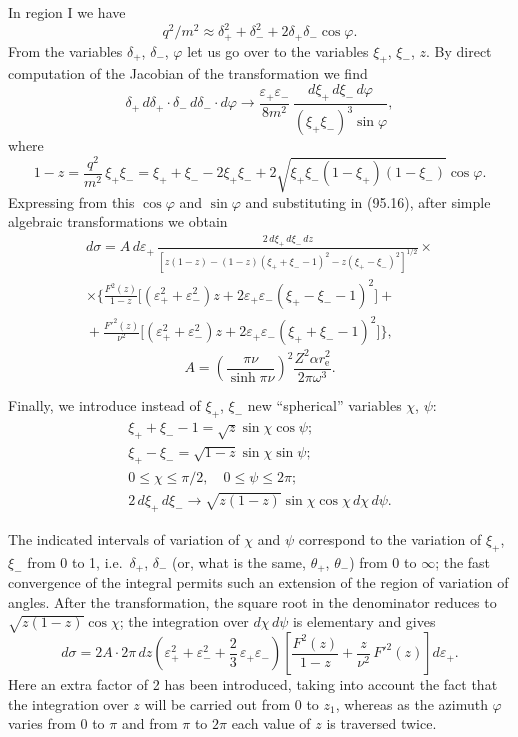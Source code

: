 In region I we have
\[
q^2/m^2 \approx \delta_+^2 + \delta_-^2 + 2\delta_+\delta_-\cos\varphi.
\]
From the variables $\delta_+$, $\delta_-$, $\varphi$ let us go over to the variables $\xi_+$, $\xi_-$, $z$. By direct computation of the Jacobian of the transformation we find
\[
\delta_+\,d\delta_+\cdot\delta_-\,d\delta_-\cdot d\varphi \to \frac{\varepsilon_+\varepsilon_-}{8m^2}\,\frac{d\xi_+\,d\xi_-\,d\varphi}{(\xi_+\xi_-)^3\sin\varphi},
\]
where
\[
1 - z = \frac{q^2}{m^2}\,\xi_+\xi_- = \xi_+ + \xi_- - 2\xi_+\xi_- + 2\sqrt{\xi_+\xi_-(1-\xi_+)(1-\xi_-)}\cos\varphi.
\]
Expressing from this $\cos\varphi$ and $\sin\varphi$ and substituting in (95.16), after simple algebraic transformations we obtain
\begin{multline*}
d\sigma = A\,d\varepsilon_+\,\frac{2\,d\xi_+\,d\xi_-\,dz}{[z(1-z) - (1-z)(\xi_+ + \xi_- - 1)^2 - z(\xi_+ - \xi_-)^2]^{1/2}} \times {} \\
\times \biggl\{\frac{F^2(z)}{1-z}\bigl[(\varepsilon_+^2 + \varepsilon_-^2)z + 2\varepsilon_+\varepsilon_-(\xi_+ - \xi_- - 1)^2\bigr] + {} \\
{} + \frac{F'^2(z)}{\nu^2}\bigl[(\varepsilon_+^2 + \varepsilon_-^2)z + 2\varepsilon_+\varepsilon_-(\xi_+ + \xi_- - 1)^2\bigr]\biggr\},
\end{multline*}
\[
A = \left(\frac{\pi\nu}{\sinh\pi\nu}\right)^{\!2}\frac{Z^2\alpha r_\mathrm{e}^2}{2\pi\omega^3}.
\]

Finally, we introduce instead of $\xi_+$, $\xi_-$ new ``spherical'' variables $\chi$, $\psi$:
\begin{gather*}
\xi_+ + \xi_- - 1 = \sqrt{z}\sin\chi\cos\psi; \\
\xi_+ - \xi_- = \sqrt{1-z}\sin\chi\sin\psi; \\
0 \leqslant \chi \leqslant \pi/2, \quad 0 \leqslant \psi \leqslant 2\pi; \\
2\,d\xi_+\,d\xi_- \to \sqrt{z(1-z)}\sin\chi\cos\chi\,d\chi\,d\psi.
\end{gather*}


The indicated intervals of variation of $\chi$ and $\psi$ correspond to the variation of $\xi_+$, $\xi_-$ from 0 to 1, i.e.\ $\delta_+$, $\delta_-$ (or, what is the same, $\theta_+$, $\theta_-$) from 0 to $\infty$; the fast convergence of the integral permits such an extension of the region of variation of angles. After the transformation, the square root in the denominator reduces to $\sqrt{z(1-z)}\cos\chi$; the integration over $d\chi\,d\psi$ is elementary and gives
\[
d\sigma = 2A\cdot 2\pi\,dz\left(\varepsilon_+^2 + \varepsilon_-^2 + \frac{2}{3}\,\varepsilon_+\varepsilon_-\right)\!\left[\frac{F^2(z)}{1-z} + \frac{z}{\nu^2}\,F'^2(z)\right]d\varepsilon_+.
\]
Here an extra factor of 2 has been introduced, taking into account the fact that the integration over $z$ will be carried out from 0 to $z_1$, whereas as the azimuth $\varphi$ varies from 0 to $\pi$ and from $\pi$ to $2\pi$ each value of $z$ is traversed twice.

